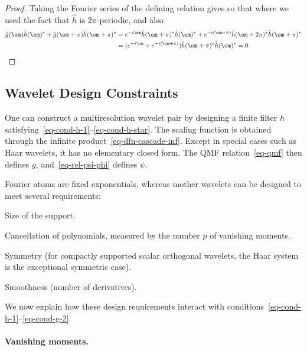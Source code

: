 \begin{proof}
	Taking the Fourier series of the defining relation gives
	so that 
	where we used the fact that $\hat h$ is $2\pi$-periodic, 
	and also 
	\begin{align*}
		\hat g(\om) \hat h(\om)^* + \hat g(\om+\pi) \hat h(\om+\pi)^* &= 
		e^{-i \om} \hat h(\om+\pi)^* \hat h(\om)^* + e^{-i (\om+\pi)} \hat h(\om+2\pi)^* \hat h(\om+\pi)^* \\
		&=
		(e^{-i \om}+e^{-i (\om+\pi)}) \hat h(\om+\pi)^* \hat h(\om)^*
		=0.
	\end{align*}
\end{proof}





\subsection{Wavelet Design Constraints}

One can construct a multiresolution wavelet pair by designing a finite filter $h$ satisfying~\eqref{eq-cond-h-1}--\eqref{eq-cond-h-star}. The scaling function is obtained through the infinite product~\eqref{eq-dfn-cascade-inf}. Except in special cases such as Haar wavelets, it has no elementary closed form. The QMF relation~\eqref{eq-qmf} then defines $g$, and~\eqref{eq-rel-psi-phi} defines $\psi$.

Fourier atoms are fixed exponentials, whereas mother wavelets can be designed to meet several requirements:
\begin{rs}
	\item Size of the support.
	\item Cancellation of polynomials, measured by the number $p$ of vanishing moments.
	\item Symmetry (for compactly supported scalar orthogonal wavelets, the Haar system is the exceptional symmetric case).
	\item Smoothness (number of derivatives).
\end{rs}
We now explain how these design requirements interact with conditions~\eqref{eq-cond-h-1}--\eqref{eq-cond-g-2}.

\paragraph{Vanishing moments.}

